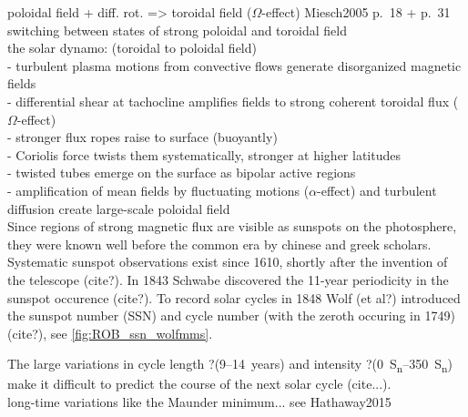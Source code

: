 poloidal field + diff. rot. => toroidal field ($\Omega$-effect) Miesch2005 p.~18 + p.~31\\
switching between states of strong poloidal and toroidal field\\

the solar dynamo: (toroidal to poloidal field)\\
- turbulent plasma motions from convective flows generate disorganized magnetic fields\\
- differential shear at tachocline amplifies fields to strong coherent toroidal flux ($\Omega$-effect)\\
- stronger flux ropes raise to surface (buoyantly)\\
- Coriolis force twists them systematically, stronger at higher latitudes\\
- twisted tubes emerge on the surface as bipolar active regions\\
- amplification of mean fields by fluctuating motions ($\alpha$-effect) and turbulent diffusion create large-scale poloidal field\\


Since regions of strong magnetic flux are visible as sunspots on the photosphere, they were known well before the common era by chinese and greek scholars. %
Systematic sunspot observations exist since 1610, shortly after the invention of the telescope (cite?). In 1843 Schwabe discovered the 11-year periodicity in the sunspot occurence (cite?). To record solar cycles in 1848 Wolf (et al?) introduced the sunspot number (SSN) and cycle number (with the zeroth occuring in 1749) (cite?), see \autoref{fig:ROB_ssn_wolfmms}.\\
\begin{figure}[htb]
\end{figure}
The large variations in cycle length ?(9--14~years) and intensity ?(\SIrange{0}{350}{S_n}) make it difficult to predict the course of the next solar cycle (cite...).\\
long-time variations like the Maunder minimum... see Hathaway2015\\

